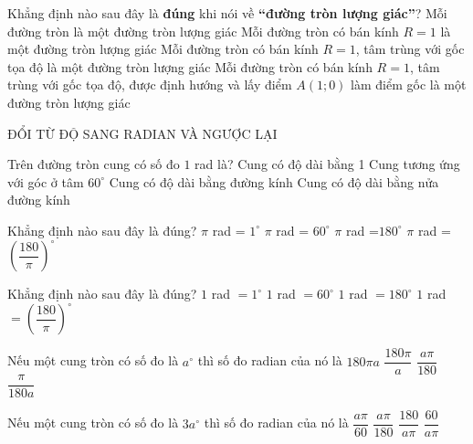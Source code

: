 \begin{ex}%
Khẳng định nào sau đây là {\bf đúng} khi nói về {\bf ``đường tròn lượng giác''}?
\choice
{Mỗi đường tròn là một đường tròn lượng giác}
{Mỗi đường tròn có bán kính $R=1$ là một đường tròn lượng giác}
{Mỗi đường tròn có bán kính $R=1$, tâm trùng với gốc tọa độ là một đường tròn lượng giác}
{\True Mỗi đường tròn có bán kính $R=1$, tâm trùng với gốc tọa độ, được định hướng và lấy điểm $A(1;0)$ làm điểm gốc là một đường tròn lượng giác}
\loigiai{
}
\end{ex}

\begin{dang} {ĐỔI TỪ ĐỘ SANG RADIAN VÀ NGƯỢC LẠI}
\end{dang}

\begin{ex}%
Trên đường tròn cung có số đo $1$ rad là?
\choice
{Cung có độ dài bằng 1}
{Cung tương ứng với góc ở tâm $60^{\circ}$}
{Cung có độ dài bằng đường kính}
{\True Cung có độ dài bằng nửa đường kính}
\end{ex}

\begin{ex}%
Khẳng định nào sau đây là đúng?
\choice
{$\pi$ rad = $1^{\circ}$}
{$\pi$ rad = $60^{\circ}$}
{\True $\pi$ rad =$180^{\circ}$}
{$\pi $ rad =${\left(\dfrac{180}{\pi}\right)}^{\circ}$}
\end{ex}

\begin{ex}%
Khẳng định nào sau đây là đúng?
\choice
{$1$ rad $=1^{\circ}$}
{$1$ rad $=60^{\circ}$}
{$1$ rad $=180^{\circ}$}
{\True $1$ rad $={\left(\dfrac{180}{\pi}\right)}^{\circ}$}
\end{ex}

\begin{ex}%
Nếu một cung tròn có số đo là $a^{\circ}$ thì số đo radian của nó là
\choice
{$180\pi a$}
{$\dfrac{180\pi}{a}$}
{\True $\dfrac{a\pi}{180}$}
{$\dfrac{\pi}{180a}$}
\end{ex}

\begin{ex}%
Nếu một cung tròn có số đo là $3a^{\circ}$ thì số đo radian của nó là
\choice
{\True $\dfrac{a\pi}{60}$}
{$\dfrac{a\pi}{180}$}
{$\dfrac{180}{a\pi}$}
{$\dfrac{60}{a\pi}$}
\end{ex}


